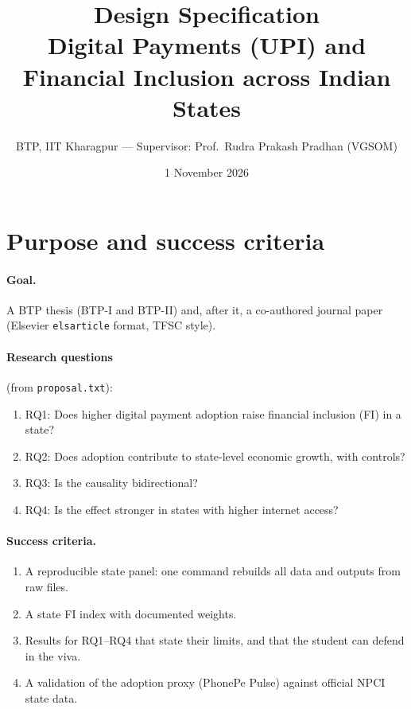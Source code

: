 \documentclass[11pt,a4paper]{article}
\title{Design Specification\\[2pt]\large Digital Payments (UPI) and Financial Inclusion across Indian States}
\author{BTP, IIT Kharagpur --- Supervisor: Prof.\ Rudra Prakash Pradhan (VGSOM)}
\date{1 November 2026}
\begin{document}
\maketitle

\section{Purpose and success criteria}

\paragraph{Goal.} A BTP thesis (BTP-I and BTP-II) and, after it, a co-authored journal paper
(Elsevier \texttt{elsarticle} format, TFSC style).

\paragraph{Research questions} (from \texttt{proposal.txt}):
\begin{enumerate}
  \item RQ1: Does higher digital payment adoption raise financial inclusion (FI) in a state?
  \item RQ2: Does adoption contribute to state-level economic growth, with controls?
  \item RQ3: Is the causality bidirectional?
  \item RQ4: Is the effect stronger in states with higher internet access?
\end{enumerate}

\paragraph{Success criteria.}
\begin{enumerate}
  \item A reproducible state panel: one command rebuilds all data and outputs from raw files.
  \item A state FI index with documented weights.
  \item Results for RQ1--RQ4 that state their limits, and that the student can defend in the viva.
  \item A validation of the adoption proxy (PhonePe Pulse) against official NPCI state data.
\end{enumerate}
\end{document}
